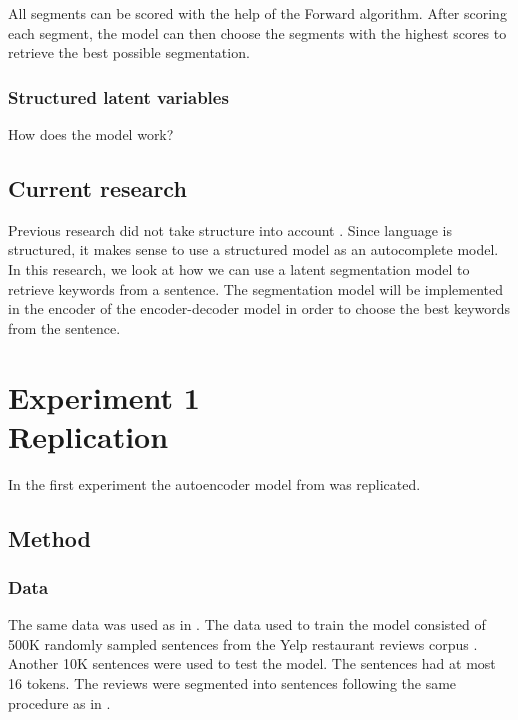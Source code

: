 \documentclass[a4paper, 12pt]{report}
\begin{document}
All segments can be scored with the help of the Forward algorithm. 
After scoring each segment, the model can then choose the segments with the highest scores to retrieve the best possible segmentation. 

\subsection{Structured latent variables}
How does the model work? 

\section{Current research}

Previous research did not take structure into account \cite{autocomplete, Bar-YossefZiv2011Cqa, SvyatkovskiyAlexey2019PACC}.
Since language is structured, it makes sense to use a structured model as an autocomplete model. 
In this research, we look at how we can use a latent segmentation model to retrieve keywords from a sentence. 
The segmentation model will be implemented in the encoder of the encoder-decoder model in order to choose the best keywords from the sentence.

\chapter{Experiment 1 \\ Replication}
In the first experiment the autoencoder model from  was replicated. 

\section{Method}

\subsection{Data}
The same data was used as in .
The data used to train the model consisted of 500K randomly sampled sentences from the Yelp restaurant reviews corpus \cite{data}.
Another 10K sentences were used to test the model. 
The sentences had at most 16 tokens. 
The reviews were segmented into sentences following the same procedure as in . 
\end{document}

